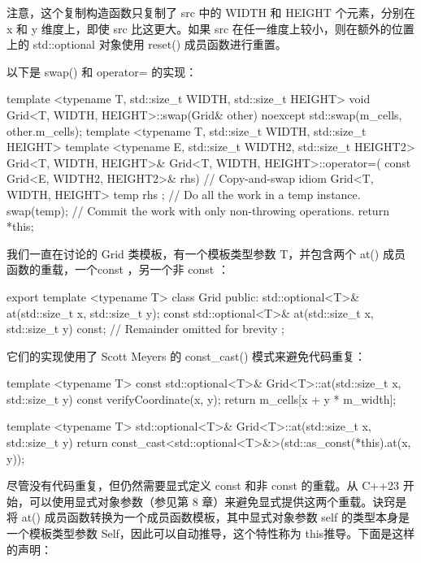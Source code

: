 注意，这个复制构造函数只复制了 src 中的 WIDTH 和 HEIGHT 个元素，分别在 x 和 y 维度上，即使 src 比这更大。如果 src 在任一维度上较小，则在额外的位置上的 std::optional 对象使用 reset() 成员函数进行重置。

以下是 swap() 和 operator= 的实现：

\begin{cpp}
template <typename T, std::size_t WIDTH, std::size_t HEIGHT>
void Grid<T, WIDTH, HEIGHT>::swap(Grid& other) noexcept
{
    std::swap(m_cells, other.m_cells);
}
template <typename T, std::size_t WIDTH, std::size_t HEIGHT>
template <typename E, std::size_t WIDTH2, std::size_t HEIGHT2>
Grid<T, WIDTH, HEIGHT>& Grid<T, WIDTH, HEIGHT>::operator=(
    const Grid<E, WIDTH2, HEIGHT2>& rhs)
{
    // Copy-and-swap idiom
    Grid<T, WIDTH, HEIGHT> temp { rhs }; // Do all the work in a temp instance.
    swap(temp); // Commit the work with only non-throwing operations.
    return *this;
}
\end{cpp}




我们一直在讨论的 Grid 类模板，有一个模板类型参数 T，并包含两个 at() 成员函数的重载，一个const ，另一个非 const ：

\begin{cpp}
export template <typename T>
class Grid
{
    public:
        std::optional<T>& at(std::size_t x, std::size_t y);
        const std::optional<T>& at(std::size_t x, std::size_t y) const;
        // Remainder omitted for brevity
};
\end{cpp}

它们的实现使用了 Scott Meyers 的 const\_cast() 模式来避免代码重复：

\begin{cpp}
template <typename T>
const std::optional<T>& Grid<T>::at(std::size_t x, std::size_t y) const
{
    verifyCoordinate(x, y);
    return m_cells[x + y * m_width];
}

template <typename T>
std::optional<T>& Grid<T>::at(std::size_t x, std::size_t y)
{
    return const_cast<std::optional<T>&>(std::as_const(*this).at(x, y));
}
\end{cpp}

尽管没有代码重复，但仍然需要显式定义 const 和非 const 的重载。从 C++23 开始，可以使用显式对象参数（参见第 8 章）来避免显式提供这两个重载。诀窍是将 at() 成员函数转换为一个成员函数模板，其中显式对象参数 self 的类型本身是一个模板类型参数 Self，因此可以自动推导，这个特性称为 this推导。下面是这样的声明：

